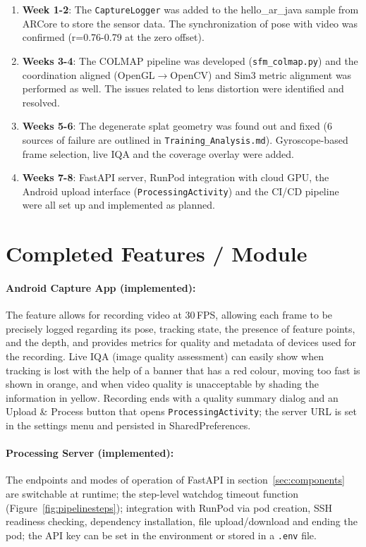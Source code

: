 \begin{enumerate}
    \item \textbf{Week 1-2}: The \texttt{CaptureLogger} was added to the hello\_ar\_java sample from ARCore to store the sensor data. The synchronization of pose with video was confirmed (r=0.76-0.79 at the zero offset).
    \item \textbf{Weeks 3-4}: The COLMAP pipeline was developed (\texttt{sfm\_colmap.py}) and the coordination aligned (OpenGL$\rightarrow$OpenCV) and Sim3 metric alignment was performed as well. The issues related to lens distortion were identified and resolved.
    \item \textbf{Weeks 5-6}: The degenerate splat geometry was found out and fixed (6 sources of failure are outlined in \texttt{Training\_Analysis.md}). Gyroscope-based frame selection, live IQA and the coverage overlay were added.
    \item \textbf{Weeks 7-8}: FastAPI server, RunPod integration with cloud GPU, the Android upload interface (\texttt{ProcessingActivity}) and the CI/CD pipeline were all set up and implemented as planned.
\end{enumerate}

\section{Completed Features / Module}
\label{sec:completed}

\paragraph{Android Capture App (implemented):} The feature allows for recording video at 30\,FPS, allowing each frame to be precisely logged regarding its pose, tracking state, the presence of feature points, and the depth, and provides metrics for quality and metadata of devices used for the recording. Live IQA (image quality assessment) can easily show when tracking is lost with the help of a banner that has a red colour, moving too fast is shown in orange, and when video quality is unacceptable by shading the information in yellow. Recording ends with a quality summary dialog and an Upload \& Process button that opens \texttt{ProcessingActivity}; the server URL is set in the settings menu and persisted in SharedPreferences.

\paragraph{Processing Server (implemented):} The endpoints and modes of operation of FastAPI in section~\ref{sec:components} are switchable at runtime; the step-level watchdog timeout function (Figure~\ref{fig:pipelinesteps}); integration with RunPod via pod creation, SSH readiness checking, dependency installation, file upload/download and ending the pod; the API key can be set in the environment or stored in a \texttt{.env} file.

